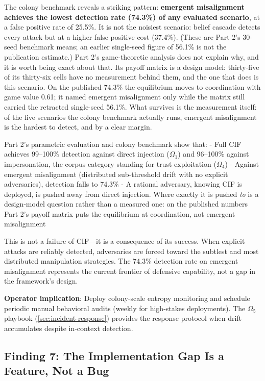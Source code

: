 \documentclass[
]{article}
\begin{document}
The colony benchmark reveals a striking pattern: \textbf{emergent
misalignment achieves the lowest detection rate (74.3\%) of any
evaluated scenario}, at a false positive rate of 25.5\%. It is not the
noisiest scenario: belief cascade detects every attack but at a higher
false positive cost (37.4\%). (These are Part 2's 30-seed benchmark
means; an earlier single-seed figure of 56.1\% is not the publication
estimate.) Part 2's game-theoretic analysis does not explain why, and it
is worth being exact about that. Its payoff matrix is a design model:
thirty-five of its thirty-six cells have no measurement behind them, and
the one that does is this scenario. On the published 74.3\% the
equilibrium moves to coordination with game value 0.61; it named
emergent misalignment only while the matrix still carried the retracted
single-seed 56.1\%. What survives is the measurement itself: of the five
scenarios the colony benchmark actually runs, emergent misalignment is
the hardest to detect, and by a clear margin.

Part 2's parametric evaluation and colony benchmark show that: - Full
CIF achieves 99--100\% detection against direct injection (\(\Omega_1\))
and 96--100\% against impersonation, the corpus category standing for
trust exploitation (\(\Omega_4\)) - Against emergent misalignment
(distributed sub-threshold drift with no explicit adversaries),
detection falls to 74.3\% - A rational adversary, knowing CIF is
deployed, is pushed away from direct injection. Where exactly it is
pushed \emph{to} is a design-model question rather than a measured one:
on the published numbers Part 2's payoff matrix puts the equilibrium at
coordination, not emergent misalignment

This is not a failure of CIF---it is a consequence of its success. When
explicit attacks are reliably detected, adversaries are forced toward
the subtlest and most distributed manipulation strategies. The 74.3\%
detection rate on emergent misalignment represents the current frontier
of defensive capability, not a gap in the framework's design.

\textbf{Operator implication}: Deploy colony-scale entropy monitoring
and schedule periodic manual behavioral audits (weekly for high-stakes
deployments). The \(\Omega_5\) playbook (\cref{sec:incident-response})
provides the response protocol when drift accumulates despite in-context
detection.

\subsection{Finding 7: The Implementation Gap Is a Feature, Not a
Bug}\label{finding-7-the-implementation-gap-is-a-feature-not-a-bug}
\end{document}
